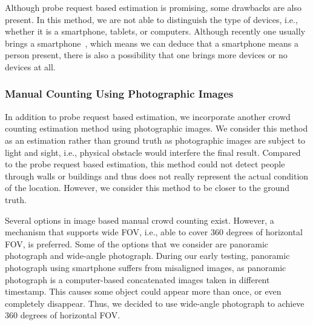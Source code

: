 	Although probe request based estimation is promising, some drawbacks are also present. In this method, we are not able to distinguish the type of devices, i.e., whether it is a smartphone, tablets, or computers. Although recently one usually brings a smartphone~\cite{thesis047}, which means we can deduce that a smartphone means a person present, there is also a possibility that one brings more devices or no devices at all.

	\subsubsection{Manual Counting Using Photographic Images} %
	\label{ssub:manual_counting_using_photo}
	In addition to probe request based estimation, we incorporate another crowd counting estimation method using photographic images. We consider this method as an estimation rather than ground truth as photographic images are subject to light and sight, i.e., physical obstacle would interfere the final result. Compared to the probe request based estimation, this method could not detect people through walls or buildings and thus does not really represent the actual condition of the location. However, we consider this method to be closer to the ground truth.
	
	Several options in image based manual crowd counting exist. However, a mechanism that supports wide \ac{FOV}, i.e., able to cover 360 degrees of horizontal \ac{FOV}, is preferred. Some of the options that we consider are panoramic photograph and wide-angle photograph. During our early testing, panoramic photograph using smartphone suffers from misaligned images, as panoramic photograph is a computer-based concatenated images taken in different timestamp. This causes some object could appear more than once, or even completely disappear. Thus, we decided to use wide-angle photograph to achieve 360 degrees of horizontal \ac{FOV}.

